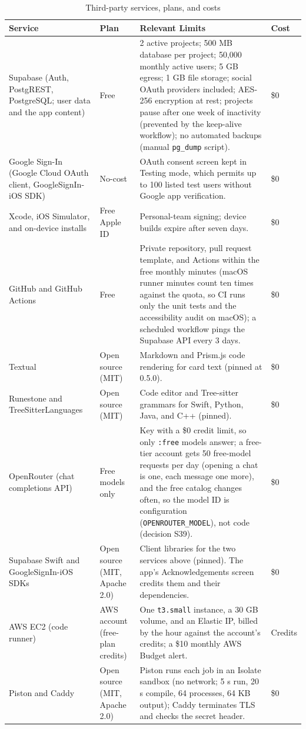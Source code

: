 \documentclass[12pt,letterpaper]{article}
\begin{document}
\begin{table}[H]
\centering
\caption{Third-party services, plans, and costs}
\label{tab:services}
\begin{tabularx}{\textwidth}{@{}L{3.2cm} L{2.4cm} Y l@{}}
\toprule
\textbf{Service} & \textbf{Plan} & \textbf{Relevant Limits} & \textbf{Cost} \\
\midrule
Supabase (Auth, PostgREST, PostgreSQL; user data and the app content) & Free & 2 active projects; 500 MB database per project; 50,000 monthly active users; 5 GB egress; 1 GB file storage; social OAuth providers included; AES-256 encryption at rest; projects pause after one week of inactivity (prevented by the keep-alive workflow); no automated backups (manual \texttt{pg\_dump} script). & \$0 \\
Google Sign-In (Google Cloud OAuth client, GoogleSignIn-iOS SDK) & No-cost & OAuth consent screen kept in Testing mode, which permits up to 100 listed test users without Google app verification. & \$0 \\
Xcode, iOS Simulator, and on-device installs & Free Apple ID & Personal-team signing; device builds expire after seven days. & \$0 \\
GitHub and GitHub Actions & Free & Private repository, pull request template, and Actions within the free monthly minutes (macOS runner minutes count ten times against the quota, so CI runs only the unit tests and the accessibility audit on macOS); a scheduled workflow pings the Supabase API every 3 days. & \$0 \\
Textual & Open source (MIT) & Markdown and Prism.js code rendering for card text (pinned at 0.5.0). & \$0 \\
Runestone and TreeSitterLanguages & Open source (MIT) & Code editor and Tree-sitter grammars for Swift, Python, Java, and C++ (pinned). & \$0 \\
OpenRouter (chat completions API) & Free models only & Key with a \$0 credit limit, so only \texttt{:free} models answer; a free-tier account gets 50 free-model requests per day (opening a chat is one, each message one more), and the free catalog changes often, so the model ID is configuration (\texttt{OPENROUTER\_MODEL}), not code (decision S39). & \$0 \\
Supabase Swift and GoogleSignIn-iOS SDKs & Open source (MIT, Apache 2.0) & Client libraries for the two services above (pinned). The app's Acknowledgements screen credits them and their dependencies. & \$0 \\
AWS EC2 (code runner) & AWS account (free-plan credits) & One \texttt{t3.small} instance, a 30 GB volume, and an Elastic IP, billed by the hour against the account's credits; a \$10 monthly AWS Budget alert. & Credits \\
Piston and Caddy & Open source (MIT, Apache 2.0) & Piston runs each job in an Isolate sandbox (no network; 5 s run, 20 s compile, 64 processes, 64 KB output); Caddy terminates TLS and checks the secret header. & \$0 \\
\bottomrule
\end{tabularx}
\end{table}
\end{document}
